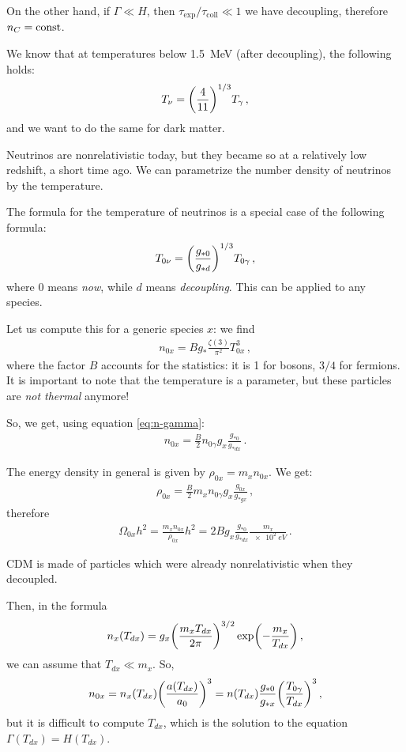 \documentclass[main.tex]{subfiles}
\begin{document}
On the other hand, if \(\Gamma \ll H\), then \(\tau _{\text{exp}} / \tau _{\text{coll}} \ll 1\) we have decoupling, therefore \(n_C = \text{const}\).

We know that at temperatures below \SI{1.5}{MeV} (after decoupling), the following holds: 
%
\begin{align}
  T_{\nu } = \qty(\frac{4}{11})^{1/3} T_{\gamma }
\,,
\end{align}
%
and we want to do the same for dark matter. 

Neutrinos are nonrelativistic today, but they became so at a relatively low redshift, a short time ago. 
We can parametrize the number density of neutrinos by the temperature. 

The formula for the temperature of neutrinos is a special case of the following formula: 
%
\begin{align}
  T_{0 \nu } = \qty(\frac{g_{*0}}{g_{*d}})^{1/3} T_{0 \gamma }
\,,
\end{align}
%
where \(0\) means \emph{now}, while  \(d\) means \emph{decoupling}. This can be applied to any species. 

Let us compute this for a generic species \(x\): we find 
%
\begin{align}
  n_{0x} = B g_{*} \frac{\zeta (3)}{\pi^2} T_{0x}^3
\,,
\end{align}
%
where the factor \(B\) accounts for the statistics: it is 1 for bosons, \(3/4\) for fermions. 
It is important to note that the temperature is a parameter, but these particles are \emph{not thermal} anymore! 

So, we get, using equation \eqref{eq:n-gamma}:
%
\begin{align}
  n_{0x} = \frac{B}{2} n_{0 \gamma } g_x \frac{g_{*0}}{g_{*dx}}
\,. 
\end{align}
%

The energy density in general is given by \(\rho_{0x} = m_x n_{0x}\). We get: 
%
\begin{align}
  \rho_{0x} = \frac{B}{2} m_x n_{0 \gamma } g_x \frac{g_{0x}}{g_{*gx}}
\,,
\end{align}
%
therefore 
%
\begin{align}
  \Omega_{0x} h^2 = \frac{m_x n_{0x}}{\rho_{0x}} h^2 
  = 2B g_x \frac{g_{*0}}{g_{*dx}} \frac{m_x}{\SI{e2}{eV}}
\,.
\end{align}

CDM is made of particles which were already nonrelativistic when they decoupled. 

Then, in the formula
%
\begin{align}
  n_x (T_{dx}) = g_{x} \qty(\frac{m_x T_{dx}}{2 \pi })^{3/2} \exp(- \frac{m_x}{T_{dx}})
\,,
\end{align}
%
we can assume that \(T_{dx} \ll m_x\). So, 
%
\begin{align}
  n_{0x} = n_x (T_{dx}) \qty(\frac{a(T_{dx})}{a_0 })^3
  = n(T_{dx}) \frac{g_{*0}}{g_{*x}} \qty(\frac{T_{0 \gamma }}{T_{dx}})^3
\,,
\end{align}
%
but it is difficult to compute \(T_{dx}\), which is the solution to the equation \(\Gamma (T_{dx}) = H (T_{dx})\). 
\end{document}
